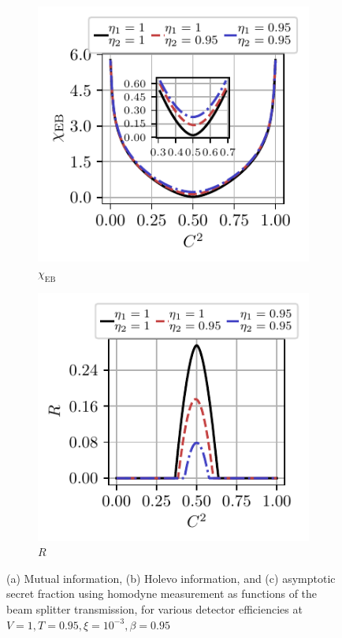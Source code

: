 \documentclass[%
reprint,
superscriptaddress,
 amsmath,amssymb,amsfonts,
 aps,
 pra,
 longbibliography
]{revtex4-2}
\newcommand{\ind}[1]{\mathrm{#1}}
\begin{document}
\begin{figure}
\begin{subfigure}[c]{.3\linewidth}
 \includegraphics[width=\linewidth, trim={.2cm .3cm .4cm .35cm},clip]{pics/qkd/hom/chi.pdf}
\caption[]{$\chi_{\ind{EB}}$}
\end{subfigure}
\hfill
    \begin{subfigure}[c]{.3\linewidth}
\includegraphics[width=\linewidth, trim={.2cm .3cm .4cm .35cm},clip]{pics/qkd/hom/r.pdf}
\caption[]{$R$}
        \end{subfigure}
        \caption{(a) Mutual information, (b) Holevo information, and (c) asymptotic secret fraction using homodyne measurement as functions of the beam splitter transmission, for various detector efficiencies at $V=1, T=0.95, \xi=10^{-3}, \beta=0.95$
}
\label{fig:homodyne-all}
\end{figure}
\end{document}
